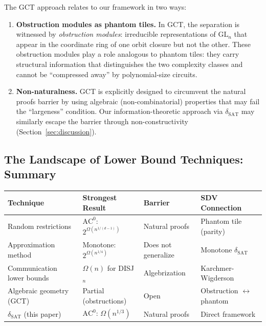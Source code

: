 \documentclass[11pt]{article}
\theoremstyle{definition}
\theoremstyle{remark}
\newcommand{\ACz}{\mathrm{AC}^0}
\newcommand{\dSAT}{\delta_{\mathrm{SAT}}}
\begin{document}
The GCT approach relates to our framework in two ways:

\begin{enumerate}[label=(\alph*),nosep]
  \item \textbf{Obstruction modules as phantom tiles.}  In GCT, the
    separation is witnessed by \emph{obstruction modules}: irreducible
    representations of $\mathrm{GL}_n$ that appear in the coordinate ring
    of one orbit closure but not the other.  These obstruction modules play
    a role analogous to phantom tiles: they carry structural information
    that distinguishes the two complexity classes and cannot be ``compressed
    away'' by polynomial-size circuits.

  \item \textbf{Non-naturalness.}  GCT is explicitly designed to circumvent
    the natural proofs barrier by using algebraic (non-combinatorial)
    properties that may fail the ``largeness'' condition.  Our
    information-theoretic approach via $\dSAT$ may similarly escape the
    barrier through non-constructivity (Section~\ref{sec:discussion}).
\end{enumerate}

\subsection{The Landscape of Lower Bound Techniques: Summary}

\begin{center}
\begin{tabular}{@{}llll@{}}
\toprule
\textbf{Technique} & \textbf{Strongest Result} & \textbf{Barrier} & \textbf{SDV Connection} \\
\midrule
Random restrictions & $\ACz$: $2^{\Omega(n^{1/(d-1)})}$ & Natural proofs & Phantom tile (parity) \\
Approximation method & Monotone: $2^{\Omega(n^{1/4})}$ & Does not generalize & Monotone $\dSAT$ \\
Communication lower bounds & $\Omega(n)$ for DISJ$_n$ & Algebrization & Karchmer-Wigderson \\
Algebraic geometry (GCT) & Partial (obstructions) & Open & Obstruction $\leftrightarrow$ phantom \\
$\dSAT$ (this paper) & $\ACz$: $\Omega(n^{1/3})$ & Natural proofs & Direct framework \\
\bottomrule
\end{tabular}
\end{center}
\end{document}
